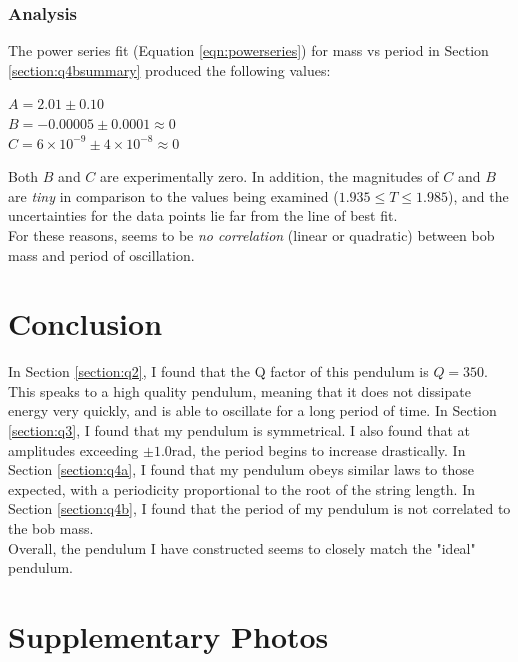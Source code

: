 \documentclass[12pt]{article}
\begin{document}
\subsubsection{Analysis}
\noindent
The power series fit (Equation \ref{eqn:powerseries}) for mass vs period in Section \ref{section:q4bsummary} produced the following values:
\begin{center}
$A= 2.01 \pm 0.10$\\
$B= -0.00005 \pm 0.0001 \approx 0$\\
$C= 6\times 10^{-9} \pm 4\times 10^{-8}\approx 0$
\end{center}
Both $B$ and $C$ are experimentally zero. In addition, the magnitudes of $C$ and $B$ are \emph{tiny} in comparison to the values being examined ($1.935\leq T \leq 1.985$), and the uncertainties for the data points lie far from the line of best fit.\\
\noindent
For these reasons, seems to be \emph{no correlation} (linear or quadratic) between bob mass and period of oscillation.

\section{Conclusion}
\label{section:conclusion}

In Section \ref{section:q2}, I found that the Q factor of this pendulum is $Q=350$. This speaks to a high quality pendulum, meaning that it does not dissipate energy very quickly, and is able to oscillate for a long period of time. 
In Section \ref{section:q3}, I found that my pendulum is symmetrical. I also found that at amplitudes exceeding $\pm1.0$rad, the period begins to increase drastically. 
In Section \ref{section:q4a}, I found that my pendulum obeys similar laws to those expected, with a periodicity proportional to the root of the string length.
In Section \ref{section:q4b}, I found that the period of my pendulum is not correlated to the bob mass.\\

Overall, the pendulum I have constructed seems to closely match the "ideal" pendulum.

\pagebreak
\appendix
\section{Supplementary Photos}
\label{section:setup}
\end{document}
